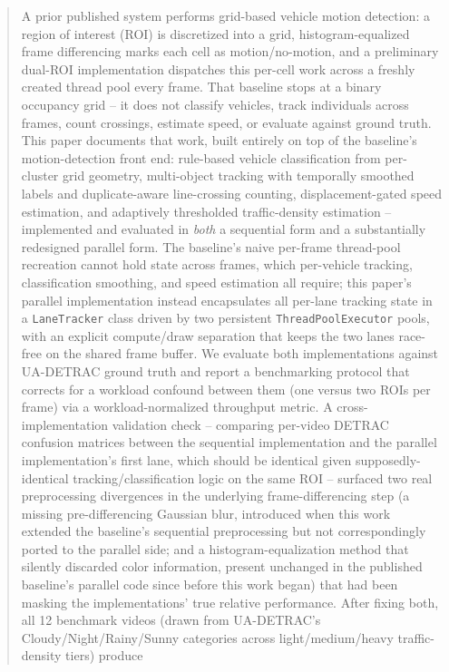 \documentclass[conference]{IEEEtran}
\newcommand{\code}[1]{\texttt{#1}}
\begin{document}
\begin{abstract}
A prior published system \cite{baseline} performs grid-based vehicle
motion detection: a region of interest (ROI) is discretized into a
grid, histogram-equalized frame differencing marks each cell as
motion/no-motion, and a preliminary dual-ROI implementation dispatches
this per-cell work across a freshly created thread pool every frame.
That baseline stops at a binary occupancy grid -- it does not classify
vehicles, track individuals across frames, count crossings, estimate
speed, or evaluate against ground truth. This paper documents that
work, built entirely on top of the baseline's motion-detection front
end: rule-based vehicle classification from per-cluster grid geometry,
multi-object tracking with temporally smoothed labels and
duplicate-aware line-crossing counting, displacement-gated speed
estimation, and adaptively thresholded traffic-density estimation --
implemented and evaluated in \emph{both} a sequential form and a
substantially redesigned parallel form. The baseline's naive
per-frame thread-pool recreation cannot hold state across frames, which
per-vehicle tracking, classification smoothing, and speed estimation all
require; this paper's parallel implementation instead encapsulates all
per-lane tracking state in a \code{LaneTracker} class driven by two
persistent \code{ThreadPoolExecutor} pools, with an explicit compute/draw
separation that keeps the two lanes race-free on the shared frame
buffer. We evaluate both implementations against UA-DETRAC ground truth
and report a benchmarking protocol that corrects for a workload confound
between them (one versus two ROIs per frame) via a workload-normalized
throughput metric. A cross-implementation validation check -- comparing
per-video DETRAC confusion matrices between the sequential
implementation and the parallel implementation's first lane, which
should be identical given supposedly-identical tracking/classification
logic on the same ROI -- surfaced two real preprocessing divergences in
the underlying frame-differencing step (a missing pre-differencing
Gaussian blur, introduced when this work extended the baseline's
sequential preprocessing but not correspondingly ported to the parallel
side; and a histogram-equalization method that silently discarded color
information, present unchanged in the published baseline's parallel
code since before this work began) that had been masking the
implementations' true relative performance. After fixing both, all 12
benchmark videos (drawn from UA-DETRAC's Cloudy/Night/Rainy/Sunny
categories across light/medium/heavy traffic-density tiers) produce

\end{abstract}
\end{document}
